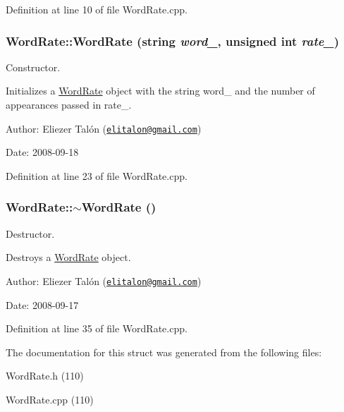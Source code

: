 Definition at line 10 of file WordRate.cpp.\hypertarget{struct_word_rate_063a8ee951293c30671f47b1559f6a5b}{
\subsubsection[WordRate]{\setlength{\rightskip}{0pt plus 5cm}WordRate::WordRate (string {\em word\_\-}, \/  unsigned int {\em rate\_\-})}}
\label{struct_word_rate_063a8ee951293c30671f47b1559f6a5b}


Constructor. 

Initializes a \hyperlink{struct_word_rate}{WordRate} object with the string word\_\- and the number of appearances passed in rate\_\-.

\begin{Desc}
\item[Author:]Eliezer Talón (\href{mailto:elitalon@gmail.com}{\tt elitalon@gmail.com}) \end{Desc}
\begin{Desc}
\item[Date:]2008-09-18 \end{Desc}


Definition at line 23 of file WordRate.cpp.\hypertarget{struct_word_rate_a86a63516e4c3d4e8aa9060ea5be6b23}{
\subsubsection[$\sim$WordRate]{\setlength{\rightskip}{0pt plus 5cm}WordRate::$\sim$WordRate ()}}
\label{struct_word_rate_a86a63516e4c3d4e8aa9060ea5be6b23}


Destructor. 

Destroys a \hyperlink{struct_word_rate}{WordRate} object.

\begin{Desc}
\item[Author:]Eliezer Talón (\href{mailto:elitalon@gmail.com}{\tt elitalon@gmail.com}) \end{Desc}
\begin{Desc}
\item[Date:]2008-09-17 \end{Desc}


Definition at line 35 of file WordRate.cpp.

The documentation for this struct was generated from the following files:\begin{CompactItemize}
\item 
WordRate.h (110)\item 
WordRate.cpp (110)\end{CompactItemize}

